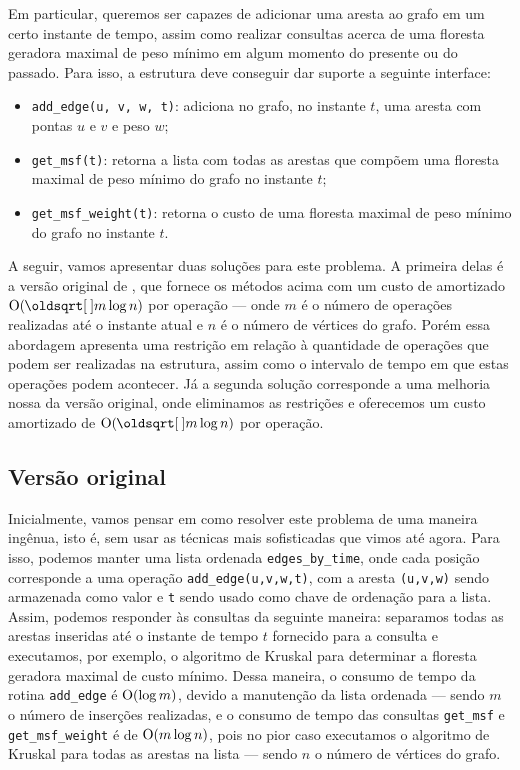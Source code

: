 Em particular, queremos ser capazes de adicionar uma aresta ao grafo em um certo instante de tempo, assim como realizar consultas acerca de uma floresta geradora maximal de peso mínimo em algum momento do presente ou do passado. Para isso, a estrutura deve conseguir dar suporte a seguinte interface:

\begin{itemize}
    \item \texttt{add\_edge(u, v, w, t)}: adiciona no grafo, no instante $t$, uma aresta com pontas $u$ e $v$ e peso $w$;
    \item \texttt{get\_msf(t)}: retorna a lista com todas as arestas que compõem uma floresta maximal de peso mínimo do grafo no instante $t$;
    \item \texttt{get\_msf\_weight(t)}: retorna o custo de uma floresta maximal de peso mínimo do grafo no instante $t$.
\end{itemize}

A seguir, vamos apresentar duas soluções para este problema. A primeira delas é a versão original de \citet{10.1093/comjnl/bxaa135}, que fornece os métodos acima com um custo de amortizado $\Oh(\sqrt{m} \log n)$ por operação --- onde $m$ é o número de operações realizadas até o instante atual e $n$ é o número de vértices do grafo. Porém essa abordagem apresenta uma restrição em relação à quantidade de operações que podem ser realizadas na estrutura, assim como o intervalo de tempo em que estas operações podem acontecer. Já a segunda solução corresponde a uma melhoria nossa da versão original, onde eliminamos as restrições e oferecemos um custo amortizado de $\Oh(\sqrt{m} \log n)$ por operação.

\subsection{Versão original}
\label{sec:rmsf-versao-ori}

Inicialmente, vamos pensar em como resolver este problema de uma maneira ingênua, isto é, sem usar as técnicas mais sofisticadas que vimos até agora. Para isso, podemos manter uma lista ordenada \texttt{edges\_by\_time}, onde cada posição corresponde a uma operação \texttt{add\_edge(u,v,w,t)}, com a aresta \texttt{(u,v,w)} sendo armazenada como valor e \texttt{t} sendo usado como chave de ordenação para a lista. Assim, podemos responder às consultas da seguinte maneira: separamos todas as arestas inseridas até o instante de tempo $t$ fornecido para a consulta e executamos, por exemplo, o algoritmo de Kruskal para determinar a floresta geradora maximal de custo mínimo. Dessa maneira, o consumo de tempo da rotina \texttt{add\_edge} é $\mathrm{O} (\log m)$, devido a manutenção da lista ordenada --- sendo $m$ o número de inserções realizadas, e o consumo de tempo das consultas \texttt{get\_msf} e \texttt{get\_msf\_weight} é de $\mathrm{O}(m \log n)$, pois no pior caso executamos o algoritmo de Kruskal para todas as arestas na lista --- sendo $n$ o número de vértices do grafo.

